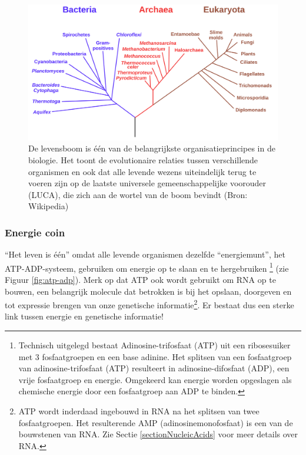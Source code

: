 \documentclass[
  11pt,
]{book}
\begin{document}
\begin{figure}

{\centering \includegraphics[width=0.8\linewidth]{./figs/Phylogenetic_tree} 

}

\caption{De levensboom is één van de belangrijkste organisatieprincipes in de biologie. Het toont de evolutionaire relaties tussen verschillende organismen en ook dat alle levende wezens uiteindelijk terug te voeren zijn op de laatste universele gemeenschappelijke voorouder (LUCA), die zich aan de wortel van de boom bevindt (Bron: Wikipedia)}\label{fig:treeOfLife}
\end{figure}

\hypertarget{sectionEnergyCoin}{%
\subsubsection{Energie coin}\label{sectionEnergyCoin}}

``Het leven is één'' omdat alle levende organismen dezelfde ``energiemunt'', het ATP-ADP-systeem, gebruiken om energie op te slaan en te hergebruiken \footnote{Technisch uitgelegd bestaat Adinosine-trifosfaat (ATP) uit een ribosesuiker met 3 fosfaatgroepen en een base adinine. Het splitsen van een fosfaatgroep van adinosine-trifosfaat (ATP) resulteert in adinosine-difosfaat (ADP), een vrije fosfaatgroep en energie. Omgekeerd kan energie worden opgeslagen als chemische energie door een fosfaatgroep aan ADP te binden.} (zie Figuur \ref{fig:atp-adp}).
Merk op dat ATP ook wordt gebruikt om RNA op te bouwen, een belangrijk molecule dat betrokken is bij het opslaan, doorgeven en tot expressie brengen van onze genetische informatie\footnote{ATP wordt inderdaad ingebouwd in RNA na het splitsen van twee fosfaatgroepen. Het resulterende AMP (adinosinemonofosfaat) is een van de bouwstenen van RNA. Zie Sectie \ref{sectionNucleicAcids} voor meer details over RNA.}. Er bestaat dus een sterke link tussen energie en genetische informatie!
\end{document}
